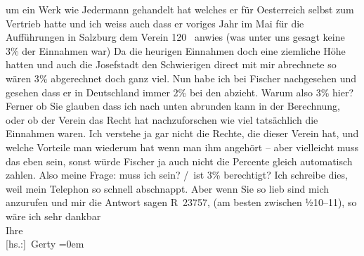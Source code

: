 \begin{ledgroupsized}[t]{13cm}
               um ein Werk wie Jedermann gehandelt hat welches
               er für Oesterreich selbst zum Vertrieb hatte
               und ich weiss auch dass er voriges Jahr im Mai für die Aufführungen in
                  Salzburg dem Verein 120 \label{K_L02525-1v}\label{K_L02525-1h} anwies (was unter uns gesagt keine 3{\%} der Einnahmen war) Da die heurigen Einnahmen doch eine
               ziemliche Höhe hatten und auch die Josefstadt den
                  Schwierigen direct mit mir abrechnete so
               wären 3{\%}{ } abgerechnet doch ganz viel.\pend
           \pstart
           Nun habe ich bei Fischer nachgesehen und gesehen
               dass er in Deutschland immer 2{\%} bei den \label{T_L02525-1v}\label{T_L02525-1h} abzieht. Warum also 3{\%} hier? Ferner ob Sie glauben dass ich nach unten abrunden
               kann in der Berechnung, oder ob der Verein das Recht hat nachzuforschen wie viel tatsächlich die Einnahmen
               waren. Ich verstehe ja gar nicht die Rechte, die dieser Verein hat, und welche Vorteile man
               wiederum hat wenn man ihm angehört – aber vielleicht muss das eben sein, sonst würde
               Fischer ja auch nicht die Percente gleich automatisch zahlen.\pend
           \pstart
           Also meine Frage: muss ich  sein?\pend
           / ist 3{\%} berechtigt?\pend
           \pstart
           Ich schreibe dies, weil mein Telephon so schnell abschnappt. Aber wenn Sie so lieb
               sind mich anzurufen und mir die Antwort sagen R 23757, (am besten zwischen
                  ½10–11), so wäre ich sehr dankbar\pend
           \pstart
           \label{T_L02525-2v}\label{T_L02525-2h}{\\[\baselineskip]}Ihre{\\[\baselineskip]}\spacefill\mbox{{[}hs.:{]} Gerty}\pend
           \leftskip=0em{}
         

\end{ledgroupsized}
